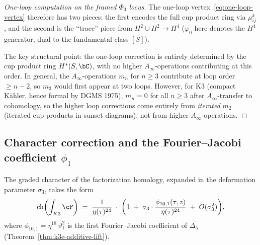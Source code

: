 \begin{proof}[One-loop computation on the framed \(\Phi_3\) locus]
The one-loop vertex~\eqref{eq:one-loop-vertex} therefore has two
pieces: the first encodes the full cup product ring via $\mu^k_{ij}$,
and the second is the ``trace'' piece from $H^2 \cup H^2 \to H^4$
($\varphi_0$ here denotes the $H^4$ generator, dual to the fundamental
class $[S]$).

The key structural point: the one-loop correction is entirely
determined by the cup product ring $H^*(S, \bC)$, with no
higher $A_\infty$-operations contributing at this order.
In general, the $A_\infty$-operations $m_n$ for $n \geq 3$
contribute at loop order $\geq n - 2$, so $m_3$ would first
appear at two loops. However, for K3 (compact K\"ahler,
hence formal by DGMS 1975), $m_n = 0$ for all $n \geq 3$
after $A_\infty$-transfer to cohomology, so the higher loop
corrections come entirely from \emph{iterated} $m_2$
(iterated cup products in sunset diagrams), not from
higher $A_\infty$-operations.
\end{proof}

\subsection{Character correction and the Fourier--Jacobi coefficient \texorpdfstring{$\phi_1$}{phi-1}}
\label{subsec:k3-fact-character}

\begin{conjecture}
\label{conj:k3-fact-character}
\ClaimStatusConjectured
The graded character of the factorization homology, expanded in
the deformation parameter $\sigma_3$, takes the form
\begin{equation}\label{eq:k3-fact-char-expansion}
 \operatorname{ch}\biggl(\int_{K3} \cF\biggr)
 \;=\;
 \frac{1}{\eta(\tau)^{24}}
 \;\cdot\;
 \biggl(
 1
 \;+\;
 \sigma_3 \cdot \frac{\phi_{10,1}(\tau, z)}{\eta(\tau)^{24}}
 \;+\;
 O(\sigma_3^2)
 \biggr),
\end{equation}
where $\phi_{10,1} = \eta^{18}\,\vartheta_1^2$ is the first
Fourier--Jacobi coefficient of $\Delta_5$
(Theorem~\textup{\ref{thm:k3e-additive-lift}}).
\end{conjecture}

